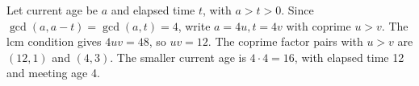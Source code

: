 Let current age be $ a $ and elapsed time $ t $, with $ a>t>0 $. Since $\gcd(a,a-t)=\gcd(a,t)=4 $, write $ a=4u,t=4v $ with coprime $ u>v $. The lcm condition gives $ 4uv=48 $, so $ uv=12 $. The coprime factor pairs with $ u>v $ are $(12,1)$ and $(4,3)$. The smaller current age is $ 4\cdot4=\boxed{16}$, with elapsed time 12 and meeting age 4.

